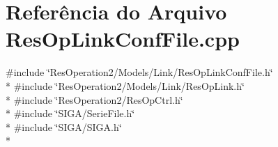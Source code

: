 \section{Referência do Arquivo Res\+Op\+Link\+Conf\+File.\+cpp}
\label{_res_op_link_conf_file_8cpp}
{\ttfamily \#include \char`\"{}Res\+Operation2/\+Models/\+Link/\+Res\+Op\+Link\+Conf\+File.\+h\char`\"{}}\\*
{\ttfamily \#include \char`\"{}Res\+Operation2/\+Models/\+Link/\+Res\+Op\+Link.\+h\char`\"{}}\\*
{\ttfamily \#include \char`\"{}Res\+Operation2/\+Res\+Op\+Ctrl.\+h\char`\"{}}\\*
{\ttfamily \#include \char`\"{}S\+I\+G\+A/\+Serie\+File.\+h\char`\"{}}\\*
{\ttfamily \#include \char`\"{}S\+I\+G\+A/\+S\+I\+G\+A.\+h\char`\"{}}\\*

